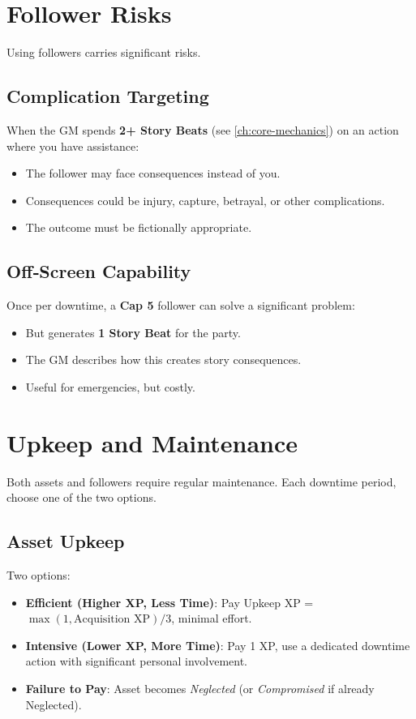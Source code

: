 \section{Follower Risks}
\label{sec:follower-risks}

Using followers carries significant risks.

\subsection*{Complication Targeting}
\label{sec:follower-complication}
When the GM spends \textbf{2+ Story Beats} (see \ref{ch:core-mechanics}) on an action where you have assistance:
\begin{itemize}
\item The follower may face consequences instead of you.
\item Consequences could be injury, capture, betrayal, or other complications.
\item The outcome must be fictionally appropriate.
\end{itemize}

\subsection*{Off‑Screen Capability}
\label{sec:follower-offscreen}
Once per downtime, a \textbf{Cap 5} follower can solve a significant problem:
\begin{itemize}
\item But generates \textbf{1 Story Beat} for the party.
\item The GM describes how this creates story consequences.
\item Useful for emergencies, but costly.
\end{itemize}

\section{Upkeep and Maintenance}
\label{subsec:upkeep-options}

Both assets and followers require regular maintenance. Each downtime period, choose one of the two options.

\subsection*{Asset Upkeep}
\label{sec:asset-upkeep}
Two options:
\begin{itemize}
\item \textbf{Efficient (Higher XP, Less Time)}:  
  Pay Upkeep XP = $\max(1, \text{Acquisition XP}) / 3$, minimal effort.
\item \textbf{Intensive (Lower XP, More Time)}:  
  Pay 1 XP, use a dedicated downtime action with significant personal involvement.
\item \textbf{Failure to Pay}: Asset becomes \emph{Neglected} (or \emph{Compromised} if already Neglected).
\end{itemize}

